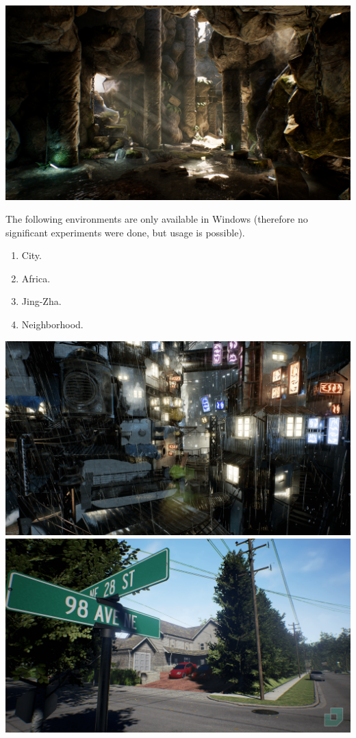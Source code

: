 \documentclass{article}
\begin{document}
 \includegraphics[scale=0.1]{environments/cave.png}

The following environments are only available in Windows
(therefore no significant experiments were done, but usage is possible).

\begin{enumerate}
    \item City.
    \item Africa.
    \item Jing-Zha.
    \item Neighborhood.
\end{enumerate}

\includegraphics[scale=0.1]{environments/city.png}
\includegraphics[scale=0.1]{environments/neighborhood.png}
\end{document}
